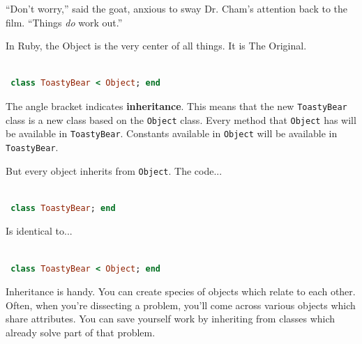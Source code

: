 \documentclass[10pt,twoside]{report}
\begin{document}
``Don't worry,'' said the goat, anxious to sway Dr. Cham's attention
back to the film.  ``Things {\em do} work out.''

In Ruby, the Object is the very center of all things.  It is The
Original.


\begin{lstlisting}[basicstyle=\ttfamily\color{basiccolor},
    commentstyle = \ttfamily\color{commentcolor},
    keywordstyle=\ttfamily\color{keywordscolor},
    stringstyle=\color{stringcolor},
    language=Ruby,
    basicstyle=\small\ttfamily,
    showstringspaces=false,
  ]

 class ToastyBear < Object; end

\end{lstlisting}


The angle bracket indicates {\bf inheritance}.  This means that the
new \lstinline[breaklines=true]|ToastyBear| class is a new class based
on the \lstinline[breaklines=true]|Object| class.  Every method that
\lstinline[breaklines=true]|Object| has will be available in
\lstinline[breaklines=true]|ToastyBear|.  Constants available in
\lstinline[breaklines=true]|Object| will be available in
\lstinline[breaklines=true]|ToastyBear|.

But every object inherits from \lstinline[breaklines=true]|Object|.
The code...


\begin{lstlisting}[basicstyle=\ttfamily\color{basiccolor},
    commentstyle = \ttfamily\color{commentcolor},
    keywordstyle=\ttfamily\color{keywordscolor},
    stringstyle=\color{stringcolor},
    language=Ruby,
    basicstyle=\small\ttfamily,
    showstringspaces=false,
  ]

 class ToastyBear; end

\end{lstlisting}


Is identical to...


\begin{lstlisting}[basicstyle=\ttfamily\color{basiccolor},
    commentstyle = \ttfamily\color{commentcolor},
    keywordstyle=\ttfamily\color{keywordscolor},
    stringstyle=\color{stringcolor},
    language=Ruby,
    basicstyle=\small\ttfamily,
    showstringspaces=false,
  ]

 class ToastyBear < Object; end

\end{lstlisting}


Inheritance is handy.  You can create species of objects which relate
to each other. Often, when you're dissecting a problem, you'll come
across various objects which share attributes.  You can save yourself
work by inheriting from classes which already solve part of that
problem.
\end{document}
